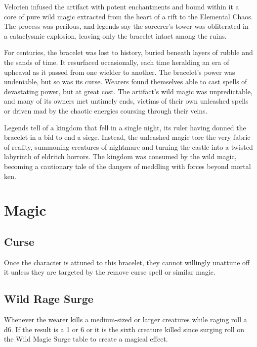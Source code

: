Velorien infused the artifact with potent enchantments and bound within it a core of pure wild magic extracted from the heart of a rift to the Elemental Chaos. The process was perilous, and legends say the sorcerer's tower was obliterated in a cataclysmic explosion, leaving only the bracelet intact among the ruins.

For centuries, the bracelet was lost to history, buried beneath layers of rubble and the sands of time. It resurfaced occasionally, each time heralding an era of upheaval as it passed from one wielder to another. The bracelet's power was undeniable, but so was its curse. Wearers found themselves able to cast spells of devastating power, but at great cost. The artifact's wild magic was unpredictable, and many of its owners met untimely ends, victims of their own unleashed spells or driven mad by the chaotic energies coursing through their veins.

Legends tell of a kingdom that fell in a single night, its ruler having donned the bracelet in a bid to end a siege. Instead, the unleashed magic tore the very fabric of reality, summoning creatures of nightmare and turning the castle into a twisted labyrinth of eldritch horrors. The kingdom was consumed by the wild magic, becoming a cautionary tale of the dangers of meddling with forces beyond mortal ken.

\section*{Magic}
\subsection*{Curse}
Once the character is attuned to this bracelet, they cannot willingly unattune off it unless they are targeted by the remove curse spell or similar magic.
\subsection*{Wild Rage Surge}
Whenever the wearer kills a medium-sized or larger creatures while raging roll a d6. If the result is a 1 or 6 or it is the sixth creature killed since surging roll on the Wild Magic Surge table to create a magical effect.